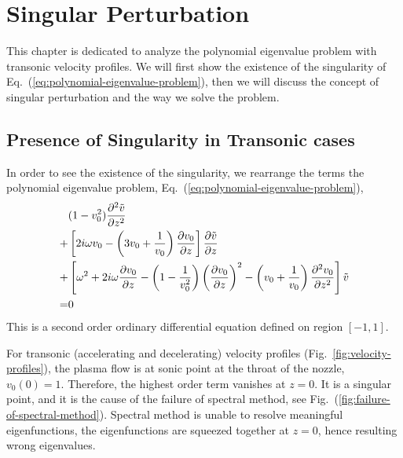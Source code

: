 \chapter{Singular Perturbation} \label{chap:singular-perturbation}
This chapter is dedicated to analyze the polynomial eigenvalue problem with transonic velocity profiles. We will first show the existence of the singularity of Eq.~(\ref{eq:polynomial-eigenvalue-problem}), then we will discuss the concept of singular perturbation and the way we solve the problem.

\section{Presence of Singularity in Transonic cases} \label{sec:presence-of-singularity}
In order to see the existence of the singularity, we rearrange the terms the polynomial eigenvalue problem, Eq.~(\ref{eq:polynomial-eigenvalue-problem}),
\begin{equation} \label{eq:singular-perturbation-problem}
	\begin{aligned}
		  & (1-v_0^2)\pdv[2]{\tilde{v}}{z}                                                                                                                                        \\
		+ & \left[2i\omega v_0 - \left(3v_0 + \frac{1}{v_0}\right)\pdv{v_0}{z}\right]\pdv{\tilde{v}}{z}                                                                           \\
		+ & \left[\omega^2 + 2i\omega\pdv{v_0}{z} -\left(1 - \frac{1}{v_0^2}\right)\left(\pdv{v_0}{z}\right)^2 - \left(v_0 + \frac{1}{v_0}\right)\pdv[2]{v_0}{z} \right]\tilde{v} \\
		= & 0
	\end{aligned}
\end{equation}
This is a second order ordinary differential equation defined on region $[-1,1]$.

For transonic (accelerating and decelerating) velocity profiles (Fig.~\ref{fig:velocity-profiles}), the plasma flow is at sonic point at the throat of the nozzle, $v_0(0)=1$. Therefore, the highest order term vanishes at $z=0$. It is a singular point, and it is the  cause of the failure of spectral method, see Fig.~(\ref{fig:failure-of-spectral-method}). Spectral method is unable to resolve meaningful eigenfunctions, the eigenfunctions are squeezed together at $z=0$, hence resulting wrong eigenvalues.

